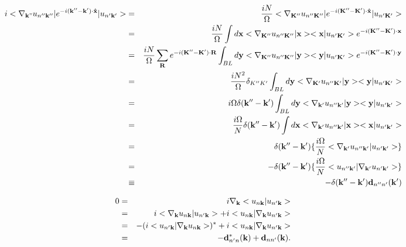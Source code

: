 \documentclass[aps,prb,preprint]{revtex4-1}
\begin{document}
\begin{appendix}
 
 \begin{eqnarray}
i <\nabla_{\bf k"} u_{n''{\bf k''}}| e^{-i{\bf (k''-k') \cdot \hat{x} }} |u_{n'{\bf k'}}> &=& \frac{iN}{\Omega} < {\bf \nabla}_{\bf K''} u_{n''{\bf K''}}| e^{-i{\bf (K''-K' )\cdot \hat{x}} }| u_{n'{\bf K'}}> \nonumber  \\
&=& \frac{iN}{\Omega} \int d{\bf x} <\nabla_{\bf K''} u_{n''{\bf K''}}|{\bf x}> <{\bf x}|u_{n'{\bf K'}}> e^{-i{\bf (K''-K' )\cdot {x}} }\nonumber \\
&=& \frac{iN}{\Omega} \sum_{\bf R} e^{-i{\bf (K''-K' )\cdot {\bf R}} } \int_{BL} d{\bf y} <\nabla_{\bf K''} u_{n''{\bf K''}}|{\bf y}> <{\bf y}| u_{n'{\bf K'}}> e^{-i{\bf (K''-K' )\cdot {y}} } \nonumber \\
&=& \frac{iN^2}{\Omega} \delta_{K''K'}  \int_{BL} d{\bf y} <\nabla_{\bf K'} u_{n''{\bf K'}}|{\bf y}> <{\bf y}| u_{n'{\bf K'}}> \nonumber \\
&=& i \Omega \delta({\bf k''-k'})  \int_{BL} d{\bf y}  < \nabla_{\bf k'} u_{n''{\bf k'}}|{\bf y}> <{\bf y}| u_{n'{\bf k'}}> \nonumber \\
&=& \frac{i\Omega}{N} \delta({\bf k''-k'})  \int d{\bf x} < \nabla_{\bf k'} u_{n''{\bf k'}}|{\bf x}> <{\bf x}|u_{n'{\bf k'}}> \nonumber \\
&=& \delta({\bf k''-k'}) \{ \frac{i \Omega}{N} <\nabla_{\bf k'} u_{n''{\bf k'}}|u_{n'{\bf k'}}>  \}\nonumber \\
&=& - \delta({\bf k''-k'}) \{ \frac{i \Omega}{N} <u_{n''{\bf k'}}|\nabla_{\bf k'} u_{n'{\bf k'}}>  \}\nonumber \\
&\equiv& - \delta({\bf k''-k'}) {\bf d}_{n''n'}({\bf k'})
 \end{eqnarray} 
 
%
\begin{eqnarray}
0 &=& i \nabla_{\bf k} <u_{n{\bf k}}|u_{n'{\bf k}}> \nonumber \\
 &=& i <\nabla_{\bf k} u_{n{\bf k}}|u_{n'{\bf k}}> + i <u_{n{\bf k}}|  \nabla_{\bf k} u_{n'{\bf k}}> \nonumber \\
 &=& - ( i < u_{n'{\bf k}}| \nabla_{\bf k} u_{n{\bf k}}> )^*+ i <u_{n{\bf k}}|  \nabla_{\bf k} u_{n'{\bf k}}> \nonumber \\
 &=& - {\bf d}_{n'n}^*({\bf k}) + {\bf d}_{nn'}({\bf k}). 
 \end{eqnarray} 
 

\end{appendix}
\end{document}
